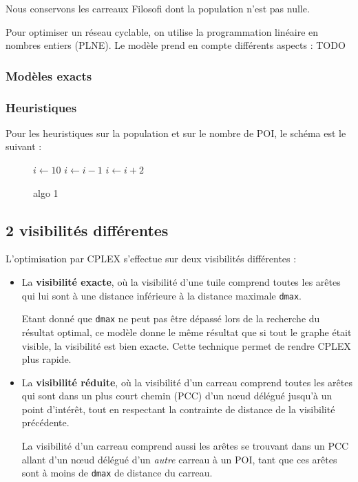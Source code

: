 \documentclass[a4paper,12pt,french]{article}
\begin{document}
Nous conservons les carreaux Filosofi dont la population n'est pas nulle.

Pour optimiser un réseau cyclable, on utilise la programmation linéaire en nombres entiers (PLNE). Le modèle prend en compte différents aspects : TODO

\subsubsection{Modèles exacts}

\subsubsection{Heuristiques}

Pour les heuristiques sur la population et sur le nombre de POI, le schéma est le suivant :

\begin{figure}[H]
    \centering
    \begin{algorithmic}
    \STATE $i\gets 10$
    \STATE $i\gets i-1$
    \ELSE
        \STATE $i\gets i+2$
    \ENDIF
    \ENDIF 
    \end{algorithmic}
    \caption{algo 1}
\end{figure}



\subsection{2 visibilités différentes}

L'optimisation par CPLEX s'effectue sur deux visibilités différentes : 

\begin{itemize}
    \item La \textbf{visibilité exacte}, où la visibilité d'une tuile comprend toutes les arêtes qui lui sont à une distance inférieure à la distance maximale \texttt{dmax}.

    Etant donné que \texttt{dmax} ne peut pas être dépassé lors de la recherche du résultat optimal, ce modèle donne le même résultat que si tout le graphe était visible, la visibilité est bien exacte. Cette technique permet de rendre CPLEX plus rapide. 

    \item La \textbf{visibilité réduite}, où la visibilité d'un carreau comprend toutes les arêtes qui sont dans un plus court chemin (PCC) d'un nœud délégué jusqu'à un point d'intérêt, tout en respectant la contrainte de distance de la visibilité précédente.

    La visibilité d'un carreau comprend aussi les arêtes se trouvant dans un PCC allant d'un nœud délégué d'un \textit{autre} carreau à un POI, tant que ces arêtes sont à moins de \texttt{dmax} de distance du carreau.
\end{itemize} 
\end{document}
